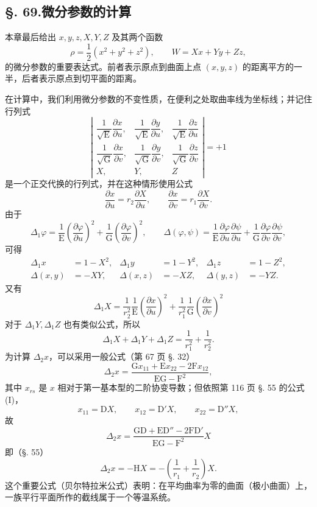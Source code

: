 \subsection*{§. 69.\quad 微分参数的计算}

本章最后给出 \(x,y,z,X,Y,Z\) 及其两个函数
\[
\rho=\frac12(x^2+y^2+z^2), \qquad W=Xx+Yy+Zz,
\]
的微分参数的重要表达式。前者表示原点到曲面上点 \((x,y,z)\) 的距离平方的一半，后者表示原点到切平面的距离。

在计算中，我们利用微分参数的不变性质，在便利之处取曲率线为坐标线；并记住行列式
\[
\left|
\begin{matrix}
\dfrac{1}{\sqrt{\mathrm{E}}}\dfrac{\partial x}{\partial u},& \dfrac{1}{\sqrt{\mathrm{E}}}\dfrac{\partial y}{\partial u},& \dfrac{1}{\sqrt{\mathrm{E}}}\dfrac{\partial z}{\partial u}\\[0.8em]
\dfrac{1}{\sqrt{\mathrm{G}}}\dfrac{\partial x}{\partial v},& \dfrac{1}{\sqrt{\mathrm{G}}}\dfrac{\partial y}{\partial v},& \dfrac{1}{\sqrt{\mathrm{G}}}\dfrac{\partial z}{\partial v}\\[0.8em]
X,&Y,&Z
\end{matrix}
\right|=+1
\]
是一个正交代换的行列式，并在这种情形使用公式
\[
\frac{\partial x}{\partial u}=r_2\frac{\partial X}{\partial u}, \qquad
\frac{\partial x}{\partial v}=r_1\frac{\partial X}{\partial v}.
\]
由于
\[
\Delta_1\varphi=\frac{1}{\mathrm{E}}\left(\frac{\partial\varphi}{\partial u}\right)^2+\frac{1}{\mathrm{G}}\left(\frac{\partial\varphi}{\partial v}\right)^2, \qquad
\Delta(\varphi,\psi)=\frac{1}{\mathrm{E}}\frac{\partial\varphi}{\partial u}\frac{\partial\psi}{\partial u}+\frac{1}{\mathrm{G}}\frac{\partial\varphi}{\partial v}\frac{\partial\psi}{\partial v},
\]
可得
\begin{align}
\tag{28}
\Delta_1x&=1-X^2, & \Delta_1y&=1-Y^2, & \Delta_1z&=1-Z^2,\\
\tag{29}
\Delta(x,y)&=-XY, & \Delta(x,z)&=-XZ, & \Delta(y,z)&=-YZ.
\end{align}
又有
\[
\Delta_1X=\frac{1}{r_2^2}\frac{1}{\mathrm{E}}\left(\frac{\partial x}{\partial u}\right)^2+\frac{1}{r_1^2}\frac{1}{\mathrm{G}}\left(\frac{\partial x}{\partial v}\right)^2
\]
对于 \(\Delta_1Y,\Delta_1Z\) 也有类似公式，所以
\begin{equation}\tag{30}
\Delta_1X+\Delta_1Y+\Delta_1Z=\frac{1}{r_1^2}+\frac{1}{r_2^2}.
\end{equation}
为计算 \(\Delta_2x\)，可以采用一般公式（第 67 页 §. 32）
\[
\Delta_2x=\frac{\mathrm{G}x_{11}+\mathrm{E}x_{22}-2\mathrm{F}x_{12}}{\mathrm{E}\mathrm{G}-\mathrm{F}^2},
\]
其中 \(x_{rs}\) 是 \(x\) 相对于第一基本型的二阶协变导数；但依照第 116 页 §. 55 的公式 (I)，
\[
x_{11}=\mathrm{D}X, \qquad x_{12}=\mathrm{D'}X, \qquad x_{22}=\mathrm{D''}X,
\]
故
\[
\Delta_2x=\frac{\mathrm{G}\mathrm{D}+\mathrm{E}\mathrm{D''}-2\mathrm{F}\mathrm{D'}}{\mathrm{E}\mathrm{G}-\mathrm{F}^2}X
\]
即（§. 55）
\begin{equation}\tag{A}
\Delta_2x=-\mathrm{H}X=-\left(\frac1{r_1}+\frac1{r_2}\right)X.
\end{equation}
这个重要公式（贝尔特拉米公式）表明：在平均曲率为零的曲面（极小曲面）上，一族平行平面所作的截线属于一个等温系统。

